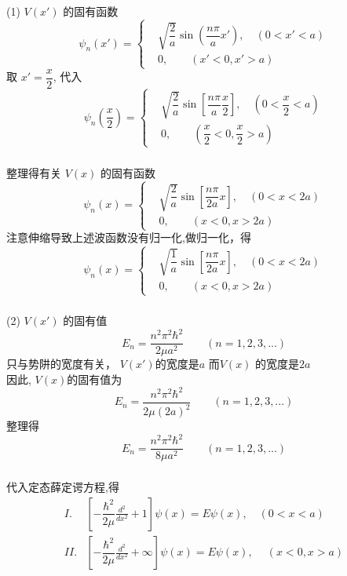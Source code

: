 \begin{frame}
  \frametitle{}
  (1)  $V(x')$ 的固有函数
  \[ \psi_n(x')=\left\{
  \begin{aligned}
	  & \sqrt{\dfrac{2}{a}} \sin(\dfrac{n\pi}{a}x'), \quad (0 < x' < a) \\ 
	  & 0, \quad \quad ( x' < 0, x' > a)
  \end{aligned} \right.
  \]
  取 $x' = \dfrac{x}{2}$, 代入
  \[ \psi_n(\dfrac{x}{2})=\left\{
  \begin{aligned}
	  & \sqrt{\dfrac{2}{a}} \sin[\dfrac{n\pi}{a}\dfrac{x}{2}], \quad (0 < \dfrac{x}{2} < a) \\ 
	  & 0, \quad \quad ( \dfrac{x}{2} < 0, \dfrac{x}{2} > a)
  \end{aligned} \right.
  \]
\end{frame} 

\begin{frame}
  \frametitle{}
  整理得有关 $V(x)$ 的固有函数
  \[ \psi_n(x)=\left\{
  \begin{aligned}
	  & \sqrt{\dfrac{2}{a}} \sin[\dfrac{n\pi}{2a}x ], \quad (0 < x  < 2a) \\ 
	  & 0, \quad \quad ( x < 0, x > 2a)
  \end{aligned} \right.
  \]
  注意伸缩导致上述波函数没有归一化,做归一化，得
  \[ \psi_n(x)=\left\{
	  \begin{aligned}
		  & \sqrt{\dfrac{1}{a}} \sin[\dfrac{n\pi}{2a}x ], \quad (0 < x   < 2a) \\ 
		  & 0, \quad \quad ( x < 0, x > 2a)
	  \end{aligned} \right.
	  \]
\end{frame} 

\begin{frame}
  \frametitle{}
  (2) $V(x')$ 的固有值
  \[E_n = \dfrac{n^2\pi^2\hbar^2}{2\mu a^2} \qquad (n=1,2,3,...) \]
  只与势阱的宽度有关， $V(x')$的宽度是$a$ 而$V(x)$ 的宽度是$2a$ \\ 
  因此, $V(x)$的固有值为
  \[E_n = \dfrac{n^2\pi^2\hbar^2}{2\mu (2a)^2} \qquad (n=1,2,3,...) \]
  整理得
  \[E_n = \dfrac{n^2\pi^2\hbar^2}{8\mu a^2} \qquad (n=1,2,3,...) \]
\end{frame} 

\begin{frame}
  \frametitle{}
	  \解 代入定态薛定谔方程,得
	  \[\begin{aligned}
		  I. &\left [ -\dfrac{\hbar^2}{2\mu } \frac{d^2 }{d x^2} + 1 \right ]\psi(x)  = E \psi(x), \quad (0 < x < a) \\
		  II. &\left [ -\dfrac{\hbar^2}{2\mu } \frac{d^2 }{d x^2} + \infty \right ]\psi(x)  = E \psi(x) ,\quad~ ( x < 0, x > a) \\
	  \end{aligned}\]
\end{frame} 


